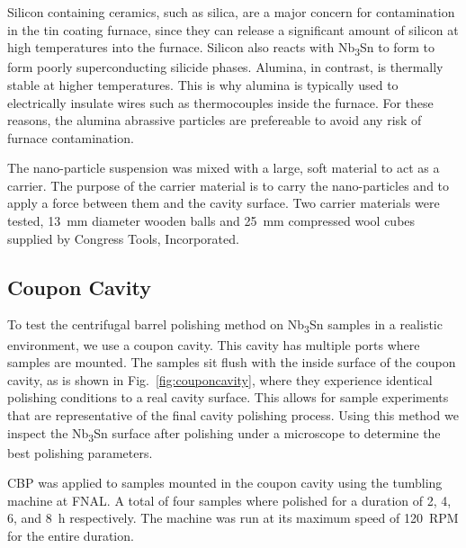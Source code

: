 \documentclass[reprint,amsmath,amssymb,aps]{revtex4-2}%
\begin{document}
Silicon containing ceramics, such as silica, are a major concern for contamination in the tin coating furnace, since they can release a significant amount of silicon at high temperatures into the furnace. Silicon also reacts with Nb\textsubscript{3}Sn to form to form poorly superconducting silicide phases. Alumina, in contrast, is thermally stable at higher temperatures. This is why alumina is typically used to electrically insulate wires such as thermocouples inside the furnace. For these reasons, the alumina abrassive particles are prefereable to avoid any risk of furnace contamination.

The nano-particle suspension was mixed with a large, soft material to act as a carrier. The purpose of the carrier material is to carry the nano-particles and to apply a force between them and the cavity surface. Two carrier materials were tested, 13~mm diameter wooden balls and 25~mm compressed wool cubes supplied by Congress Tools, Incorporated.

%
\subsection{Coupon Cavity}%
\label{subsec:couponcavity}%
To test the centrifugal barrel polishing method on Nb\textsubscript{3}Sn samples in a realistic environment, we use a coupon cavity\cite{higuchi1996investigation}. This cavity has multiple ports where samples are mounted. The samples sit flush with the inside surface of the coupon cavity, as is shown in Fig.~\ref{fig:couponcavity}, where they experience identical polishing conditions to a real cavity surface. This allows for sample experiments that are representative of the final cavity polishing process. Using this method we inspect the Nb\textsubscript{3}Sn surface after polishing under a microscope to determine the best polishing parameters.

CBP was applied to samples mounted in the coupon cavity using the tumbling machine at FNAL. A total of four samples where polished for a duration of 2, 4, 6, and 8~\unit{\hour} respectively. The machine was run at its maximum speed of 120~RPM for the entire duration.
%
\end{document}
